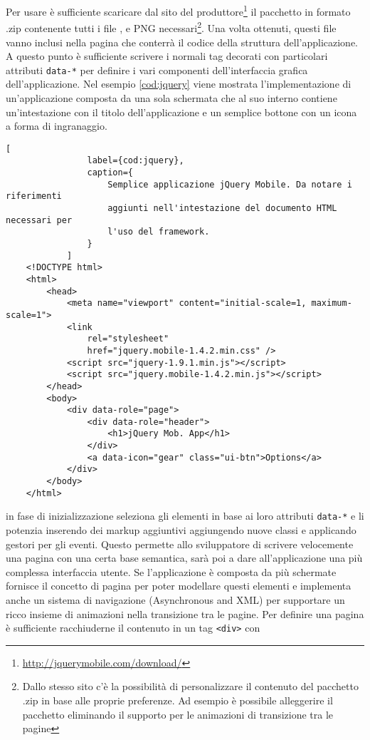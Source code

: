 			Per usare \jqm{} è sufficiente scaricare dal sito del
			produttore\footnote{\url{http://jquerymobile.com/download/}} il
			pacchetto in formato .zip contenente tutti i file \js{}, \css{} e
			PNG necessari\footnote{Dallo stesso sito c'è la possibilità di
			personalizzare il contenuto del pacchetto .zip in base alle proprie
			preferenze. Ad esempio è possibile alleggerire il pacchetto
			eliminando il supporto per le animazioni di transizione tra le
			pagine}. Una volta ottenuti, questi file vanno inclusi nella pagina
			\html{} che conterrà il codice della struttura dell'applicazione. A
			questo punto è sufficiente scrivere i normali tag \html{} decorati con
			particolari attributi \verb|data-*| per definire i vari componenti
			dell'interfaccia grafica dell'applicazione. Nel esempio \ref{cod:jquery}
			viene mostrata l'implementazione di un'applicazione composta da
			una sola schermata che al suo interno contiene un'intestazione con
			il titolo dell'applicazione e un semplice bottone con un icona a
			forma di ingranaggio.\clearpage
			\begin{lstlisting}[
				label={cod:jquery},
				caption={
					Semplice applicazione jQuery Mobile. Da notare i riferimenti
					aggiunti nell'intestazione del documento HTML necessari per
					l'uso del framework.
				}
			]
	<!DOCTYPE html>
	<html>
		<head>
			<meta name="viewport" content="initial-scale=1, maximum-scale=1">
			<link
				rel="stylesheet"
				href="jquery.mobile-1.4.2.min.css" />
			<script src="jquery-1.9.1.min.js"></script>
			<script src="jquery.mobile-1.4.2.min.js"></script>
		</head>
		<body>
			<div data-role="page">
				<div data-role="header">
					<h1>jQuery Mob. App</h1>
				</div>
				<a data-icon="gear" class="ui-btn">Options</a>
			</div>
		</body>
	</html>
			\end{lstlisting}
			\jqm{} in fase di inizializzazione seleziona gli elementi in
			base ai loro attributi \verb|data-*| e li potenzia inserendo dei markup
			aggiuntivi aggiungendo nuove classi \css{} e applicando gestori per gli
			eventi.	Questo permette allo sviluppatore di scrivere velocemente
			una pagina con una certa base semantica, sarà poi \jqm{} a
			dare all'applicazione una più complessa interfaccia utente.	Se
			l'applicazione è composta da più schermate \jqm{} fornisce 
			il concetto di pagina per poter modellare questi elementi e
			implementa anche un sistema di navigazione \ajax{} (Asynchronous
			\js{} and XML) per supportare un ricco insieme di animazioni
			nella transizione tra le pagine. Per definire una pagina è
			sufficiente racchiuderne il contenuto in un tag \verb|<div>| con
